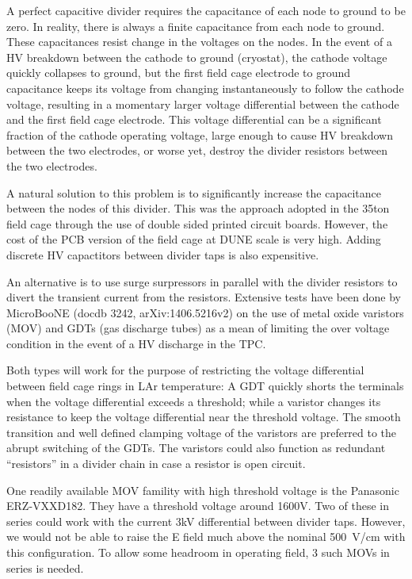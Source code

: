 A perfect capacitive divider requires the capacitance of each node to ground to be zero.  In reality, there is always a finite capacitance from each node to ground.  These capacitances resist change in the voltages on the nodes. In the event of a HV breakdown between the cathode to ground (cryostat), the cathode voltage quickly collapses to ground, but the first field cage electrode to ground capacitance keeps its voltage from changing instantaneously to follow the cathode voltage, resulting in a momentary larger voltage differential between the cathode and the first field cage electrode. This voltage differential can be a significant fraction of the cathode operating voltage, large enough to cause HV breakdown between the two electrodes, or worse yet, destroy the divider resistors between the two electrodes.

A natural solution to this problem is to significantly increase the capacitance between the nodes of this divider. This was the approach adopted in the 35ton field cage through the use of double sided printed circuit boards.  However, the cost of the PCB version of the field cage at DUNE scale is very high. Adding discrete HV capactitors between divider taps is also expensitive.

An alternative is to use surge surpressors in parallel with the divider resistors to divert the transient current from the resistors. Extensive tests have been done by MicroBooNE (docdb 3242, arXiv:1406.5216v2) on the use of metal oxide varistors (MOV) and GDTs (gas discharge tubes) as a mean of limiting the over voltage condition in the event of a HV discharge in the TPC.

Both types will work for the purpose of restricting the voltage differential between field cage rings in LAr temperature: 
A GDT quickly shorts the terminals when the voltage differential exceeds a threshold; while
a varistor changes its resistance to keep the voltage differential near the threshold voltage.
The smooth transition and well defined clamping voltage of the varistors are preferred to the abrupt switching of the GDTs.
The varistors could also function as redundant ``resistors'' in a divider chain in case a resistor is open circuit.

One readily available MOV famility with high threshold voltage is the Panasonic ERZ-VXXD182.  They have a threshold voltage around 1600V.  Two of these in series could work with the current 3kV differential between divider taps.  However, we would not be able to raise the E field much above the nominal 500~V/cm with this configuration.  To allow some headroom in operating field, 3 such MOVs in series is needed.





